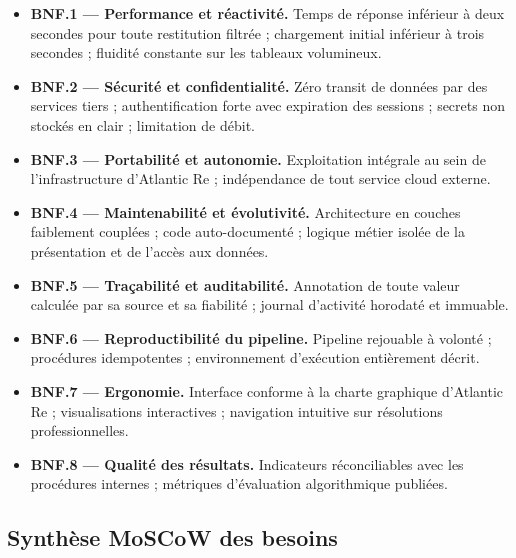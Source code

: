 \documentclass[12pt,a4paper]{report}
\begin{document}
\begin{itemize}[leftmargin=1.5cm, itemsep=4pt]
  \item \textbf{BNF.1 --- Performance et réactivité.} Temps de réponse inférieur à deux secondes pour toute restitution filtrée ; chargement initial inférieur à trois secondes ; fluidité constante sur les tableaux volumineux.

  \item \textbf{BNF.2 --- Sécurité et confidentialité.} Zéro transit de données par des services tiers ; authentification forte avec expiration des sessions ; secrets non stockés en clair ; limitation de débit.

  \item \textbf{BNF.3 --- Portabilité et autonomie.} Exploitation intégrale au sein de l'infrastructure d'Atlantic Re ; indépendance de tout service cloud externe.

  \item \textbf{BNF.4 --- Maintenabilité et évolutivité.} Architecture en couches faiblement couplées ; code auto-documenté ; logique métier isolée de la présentation et de l'accès aux données.

  \item \textbf{BNF.5 --- Traçabilité et auditabilité.} Annotation de toute valeur calculée par sa source et sa fiabilité ; journal d'activité horodaté et immuable.

  \item \textbf{BNF.6 --- Reproductibilité du pipeline.} Pipeline rejouable à volonté ; procédures idempotentes ; environnement d'exécution entièrement décrit.

  \item \textbf{BNF.7 --- Ergonomie.} Interface conforme à la charte graphique d'Atlantic Re ; visualisations interactives ; navigation intuitive sur résolutions professionnelles.

  \item \textbf{BNF.8 --- Qualité des résultats.} Indicateurs réconciliables avec les procédures internes ; métriques d'évaluation algorithmique publiées.
\end{itemize}









\subsection{Synthèse MoSCoW des besoins}
\end{document}
